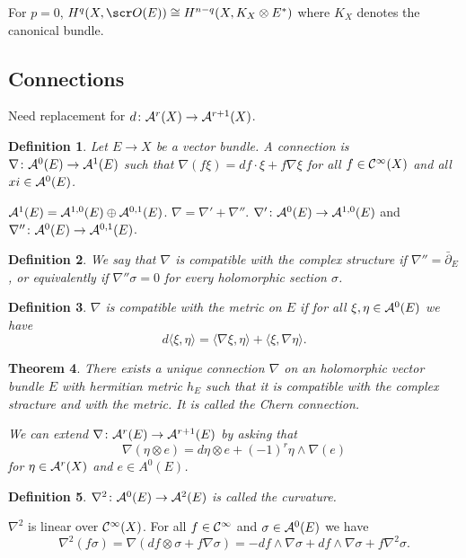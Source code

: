\documentclass[A4paper, british, reqno]{amsart}
\theoremstyle{darkgreentheorem}
\newtheorem{thm}{Theorem}[section]
\theoremstyle{darkbluedefinition}
\newtheorem{defn}[thm]{Definition}
\theoremstyle{darkredexample}
\theoremstyle{remark}
\newcommand{\1}{\mathbbm{1}}
\newcommand{\ot}{\otimes}
\newcommand{\op}{\oplus}
\begin{document}
For $p=0$, $H^{q}(X,\O(E))\cong H^{n-q}(X,K_{X}\ot E^{*})$ where $K_{X}$ denotes the canonical bundle.

\subsection{Connections}

Need replacement for $d\colon \mathcal{A}^{r}(X)\to \mathcal{A}^{r+1}(X)$.

\begin{defn}
    Let $E\to X$ be a vector bundle.
    A \textit{connection} is $\nabla \colon \mathcal{A}^{0}(E)\to \mathcal{A}^{1}(E)$ such that $\nabla(f\xi)=df\cdot \xi + f\nabla \xi$ for all $f\in \mathcal{C}^{\infty}(X)$ and all $xi\in \mathcal{A}^{0}(E)$.
\end{defn}

$\calA^{1}(E)=\calA^{1,0}(E)\op \calA^{0,1}(E)$.
$\nabla =\nabla'+ \nabla''$.
$\nabla'\colon \mathcal{A}^{0}(E)\to \mathcal{A}^{1,0}(E)$ and $\nabla''\colon \mathcal{A}^{0}(E)\to \mathcal{A}^{0,1}(E)$.

\begin{defn}
    We say that $\nabla $ is compatible with the complex structure if $\nabla''=\bar{\partial}_{E}$, or equivalently if $\nabla''\sigma=0$ for every holomorphic section $\sigma$.
\end{defn}

\begin{defn}
    $\nabla$ is compatible with the metric on $E$ if for all $\xi,\eta\in \mathcal{A}^{0}(E)$ we have
    \[ d\langle \xi ,\eta \rangle =\langle \nabla \xi ,\eta\rangle + \langle \xi,\nabla\eta \rangle.\]
\end{defn}

\begin{thm}
    There exists a unique connection $\nabla$ on an holomorphic vector bundle $E$ with hermitian metric $h_{E}$ such that it is compatible with the complex stracture and with the metric.
    It is called the \textit{Chern connection}.

    We can extend $\nabla \colon \mathcal{A}^{r}(E)\to \mathcal{A}^{r+1}(E)$ by asking that
    \[ \nabla(\eta\ot e)=d\eta \ot e+(-1)^{r}\eta \wedge \nabla(e) \]
    for $\eta \in \mathcal{A}^{r}(X)$ and $e\in A^{0}(E)$.
\end{thm}

\begin{defn}
    $\nabla^{2}\colon \mathcal{A}^{0}(E)\to \mathcal{A}^{2}(E)$ is called the \textit{curvature}.
\end{defn}

$\nabla^{2}$ is linear over $\mathcal{C}^{\infty}(X)$.
For all $f\in \mathcal{C}^{\infty}$ and $\sigma \in \mathcal{A}^{0}(E)$ we have
\[ \nabla^{2}(f\sigma)=\nabla(df\ot \sigma + f\nabla \sigma)=-df\wedge \nabla\sigma +df\wedge \nabla \sigma +f\nabla^{2}\sigma.\]
\end{document}
